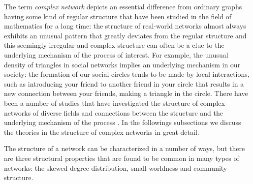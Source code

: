 	The term \textit{complex network} depicts an essential difference from ordinary graphs having some kind of regular structure that have been studied in the field of mathematics for a long time: the structure of real-world networks almost always exhibits an unusual pattern that greatly deviates from the regular structure and this seemingly irregular and complex structure can often be a clue to the underlying mechanism of the process of interest.  For example, the unusual density of triangles in social networks implies an underlying mechanism in our society: the formation of our social circles tends to be made by local interactions, such as introducing your friend to another friend in your circle that results in a new connection between your friends, making a triangle in the circle. There have been a number of studies that have investigated the structure of complex networks of diverse fields and connections between the structure and the underlying mechanism of the process \cite{Strogatz2001, Newman03thestructure, StatisticalMechanics, boccaletti06}. In the followings subsections we discuss the theories in the structure of complex networks in great detail.
	
	The structure of a network can be characterized in a number of ways, but there are three structural properties that are found to be common in many types of networks: the skewed degree distribution, small-worldness and community structure.
	
